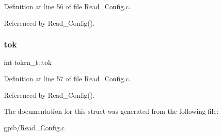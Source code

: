 Definition at line 56 of file Read\+\_\+\+Config.\+c.



Referenced by Read\+\_\+\+Config().

\mbox{\label{structtoken__t_ab6ff2146ea8b1275e249fd0412988215}} 
\subsubsection{\texorpdfstring{tok}{tok}}
{\footnotesize\ttfamily int token\+\_\+t\+::tok}



Definition at line 57 of file Read\+\_\+\+Config.\+c.



Referenced by Read\+\_\+\+Config().



The documentation for this struct was generated from the following file\+:\begin{DoxyCompactItemize}
\item 
gpib/\hyperlink{Read__Config_8c}{Read\+\_\+\+Config.\+c}\end{DoxyCompactItemize}
